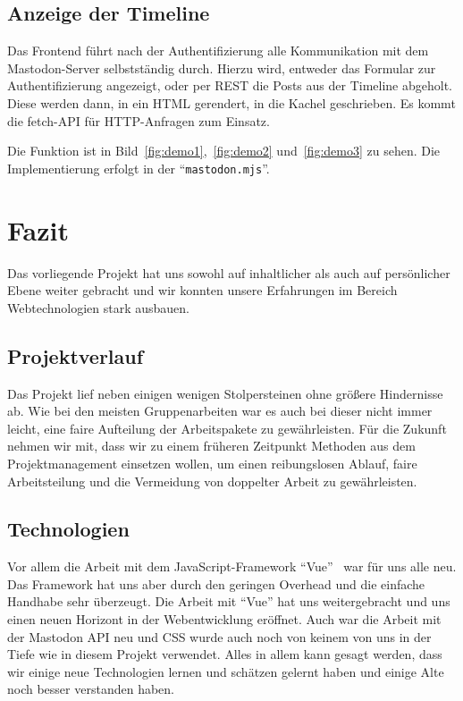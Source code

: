 \documentclass[fleqn,10pt]{SelfArx} %
\begin{document}
\subsection{Anzeige der Timeline}
Das Frontend führt nach der Authentifizierung alle Kommunikation mit dem Mastodon-Server selbstständig durch. Hierzu wird, entweder das Formular zur Authentifizierung angezeigt, oder per REST die Posts aus der Timeline abgeholt. Diese werden dann, in ein HTML gerendert, in die Kachel geschrieben. Es kommt die fetch-API für HTTP-Anfragen zum Einsatz.

Die Funktion ist in Bild~\ref{fig:demo1},~\ref{fig:demo2} und~\ref{fig:demo3} zu sehen. Die Implementierung erfolgt in der \enquote{\texttt{mastodon.mjs}}.
\section{Fazit}
Das vorliegende Projekt hat uns sowohl auf inhaltlicher als auch auf persönlicher Ebene weiter gebracht und wir konnten unsere Erfahrungen im Bereich Webtechnologien stark ausbauen.
\subsection{Projektverlauf}
Das Projekt lief neben einigen wenigen Stolpersteinen ohne größere Hindernisse ab. Wie bei den meisten Gruppenarbeiten war es auch bei dieser nicht immer leicht, eine faire Aufteilung der Arbeitspakete zu gewährleisten. Für die Zukunft nehmen wir mit, dass wir zu einem früheren Zeitpunkt Methoden aus dem Projektmanagement einsetzen wollen, um einen reibungslosen Ablauf, faire Arbeitsteilung und die Vermeidung von doppelter Arbeit zu gewährleisten.
\subsection{Technologien}
Vor allem die Arbeit mit dem JavaScript-Framework \enquote{Vue}~\cite{vue} war für uns alle neu. Das Framework hat uns aber durch den geringen Overhead und die einfache Handhabe sehr überzeugt. Die Arbeit mit \enquote{Vue} hat uns weitergebracht und uns einen neuen Horizont in der Webentwicklung eröffnet. 
Auch war die Arbeit mit der Mastodon API neu und CSS wurde auch noch von keinem von uns in der Tiefe wie in diesem Projekt verwendet. Alles in allem kann gesagt werden, dass wir einige neue Technologien lernen und schätzen gelernt haben und einige Alte noch besser verstanden haben.
\end{document}
